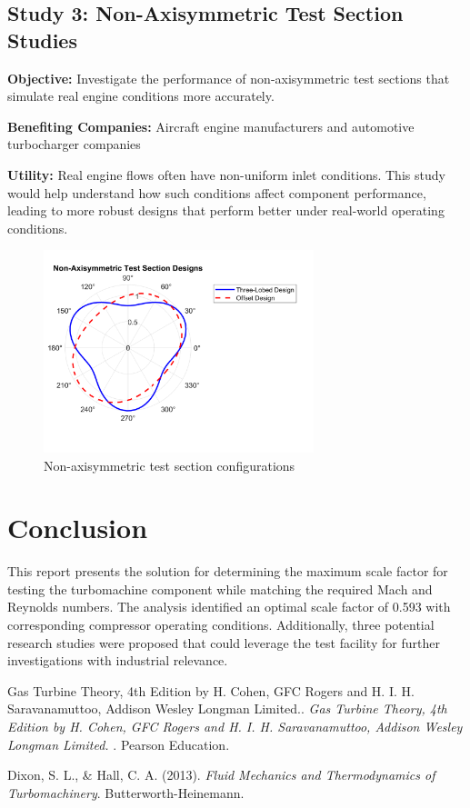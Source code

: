 \documentclass[12pt]{article}
\begin{document}
\subsection*{Study 3: Non-Axisymmetric Test Section Studies}
\textbf{Objective:} Investigate the performance of non-axisymmetric test sections that simulate real engine conditions more accurately.

\textbf{Benefiting Companies:} Aircraft engine manufacturers and automotive turbocharger companies

\textbf{Utility:} Real engine flows often have non-uniform inlet conditions. This study would help understand how such conditions affect component performance, leading to more robust designs that perform better under real-world operating conditions.

\begin{figure}[H]
    \centering
    \includegraphics[width=0.7\textwidth]{non_axisymmetric.png}
    \caption{Non-axisymmetric test section configurations}
    \label{fig:non_axisymmetric}
\end{figure}

\section*{Conclusion}
This report presents the solution for determining the maximum scale factor for testing the turbomachine component while matching the required Mach and Reynolds numbers. The analysis identified an optimal scale factor of 0.593 with corresponding compressor operating conditions. Additionally, three potential research studies were proposed that could leverage the test facility for further investigations with industrial relevance.

\begin{thebibliography}{9}
Gas Turbine Theory, 4th Edition by H. Cohen, GFC Rogers and H. I. H. Saravanamuttoo, Addison
Wesley Longman Limited.. 
\textit{Gas Turbine Theory, 4th Edition by H. Cohen, GFC Rogers and H. I. H. Saravanamuttoo, Addison
Wesley Longman Limited.
}. 
Pearson Education.

Dixon, S. L., \& Hall, C. A. (2013). 
\textit{Fluid Mechanics and Thermodynamics of Turbomachinery}. 
Butterworth-Heinemann.
\end{thebibliography}
\end{document}
